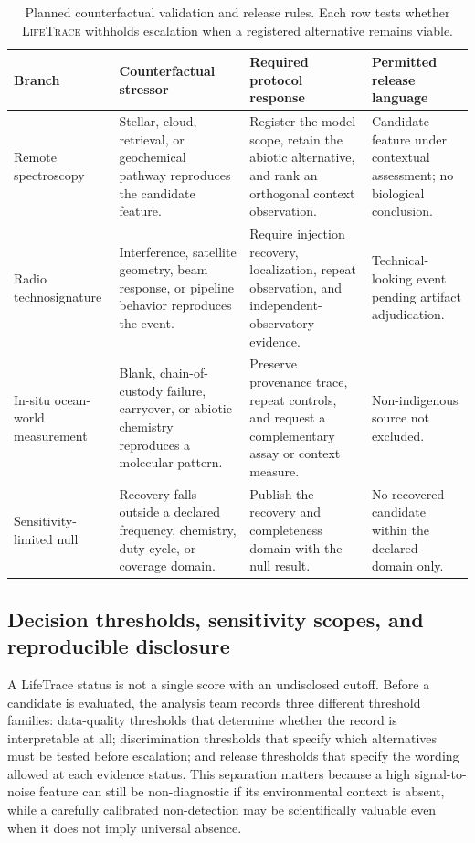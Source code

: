 \documentclass[conference]{IEEEtran}
\newcommand{\lifetrace}{\textsc{LifeTrace}}
\begin{document}
\begin{table}[t]
\caption{Planned counterfactual validation and release rules. Each row tests whether \lifetrace{} withholds escalation when a registered alternative remains viable.}
\label{tab:counterfactual}
\centering
\footnotesize
\setlength{\tabcolsep}{3pt}
\begin{tabular}{p{} p{} p{} p{}}
\hline
\textbf{Branch} & \textbf{Counterfactual stressor} & \textbf{Required protocol response} & \textbf{Permitted release language}\\
\hline
Remote spectroscopy & Stellar, cloud, retrieval, or geochemical pathway reproduces the candidate feature. & Register the model scope, retain the abiotic alternative, and rank an orthogonal context observation. & Candidate feature under contextual assessment; no biological conclusion.\\
Radio technosignature & Interference, satellite geometry, beam response, or pipeline behavior reproduces the event. & Require injection recovery, localization, repeat observation, and independent-observatory evidence. & Technical-looking event pending artifact adjudication.\\
In-situ ocean-world measurement & Blank, chain-of-custody failure, carryover, or abiotic chemistry reproduces a molecular pattern. & Preserve provenance trace, repeat controls, and request a complementary assay or context measure. & Non-indigenous source not excluded.\\
Sensitivity-limited null & Recovery falls outside a declared frequency, chemistry, duty-cycle, or coverage domain. & Publish the recovery and completeness domain with the null result. & No recovered candidate within the declared domain only.\\
\hline
\end{tabular}
\end{table}

\subsection{Decision thresholds, sensitivity scopes, and reproducible disclosure}

A LifeTrace status is not a single score with an undisclosed cutoff. Before a candidate is evaluated, the analysis team records three different threshold families: data-quality thresholds that determine whether the record is interpretable at all; discrimination thresholds that specify which alternatives must be tested before escalation; and release thresholds that specify the wording allowed at each evidence status. This separation matters because a high signal-to-noise feature can still be non-diagnostic if its environmental context is absent, while a carefully calibrated non-detection may be scientifically valuable even when it does not imply universal absence.
\end{document}
